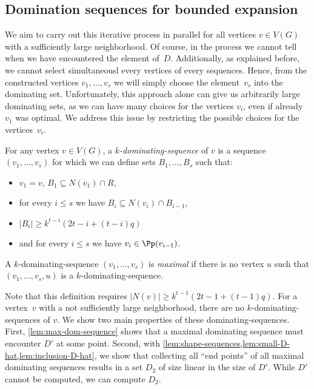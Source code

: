 \subsection{Domination sequences for bounded expansion}\label{lem:dom-seq-general}
We aim to carry out this iterative process in parallel
for all vertices \mbox{$v\in V(G)$} with a sufficiently large neighborhood.
Of course, in the process
we cannot tell when we have encountered the element of~$D$.
Additionally, as explained before, we cannot select simultaneousl
every vertices of every sequences.
Hence, from the constructed vertices $v_1,\ldots, v_s$
we will simply choose the element~$v_s$ into the dominating set.
Unfortunately, this approach alone can give us arbitrarily large
dominating sets, as we can have many choices for the vertices
$v_i$, even if already $v_1$ was optimal.
We address this issue by restricting
the possible choices for the vertices~$v_i$.

\begin{definition}\label{def:dom-sequence}
  For any vertex $v\in V(G)$, a {\em $k$-dominating-sequence} of $v$ is a sequence
  $(v_1,\ldots,v_s)$ for which we can define sets $B_1,\ldots,B_s$ such that:
  \begin{itemize}
    \item $v_1=v$, $B_1 \subseteq N(v_1)\cap R$,
    \item for every $i\le s$ we have $B_{i} \subseteq N(v_{i})\cap B_{i-1}$,
    \item $|B_{i}|\geq k^{t-i}(2t-i+(t-i)q)$
    \item and for every $i\le s$ we have $v_i\in \Pp(v_{i-1})$.
  \end{itemize}
  A $k$-dominating-sequence $(v_1,\ldots,v_s)$ is {\em maximal} if there is no
  vertex $u$ such that $(v_1,\ldots,v_s,u)$ is a $k$-dominating-sequence.
\end{definition}

Note that this definition requires $|N(v)|\ge k^{t-1}(2t-1+(t-1)q)$. For a
vertex~$v$ with a not sufficiently large neighborhood, there are no
$k$-dominating-sequences of $v$.
We show two main properties of these dominating-sequences.
First, \cref{lem:max-dom-sequence} shows that a maximal dominating sequence must
encounter $D'$ at some point. Second, with \cref{lem:shape-sequences,lem:small-D-hat,lem:inclusion-D-hat},
we show that collecting all ``end points'' of all maximal dominating sequences
results in a set $D_2$ of size linear in the size of $D'$. While $D'$ cannot be computed, we
can compute $D_2$.
%

